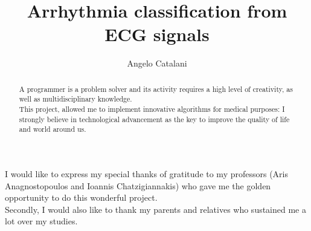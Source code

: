 \documentclass[LaM,binding=0.6cm]{sapthesis}
\title{Arrhythmia classification from ECG signals}
\author{Angelo Catalani}
\begin{document}
\frontmatter

\maketitle

\dedication{Dedicated to\\ my parents}

\begin{abstract}
A programmer is a problem solver and its activity requires a high level of creativity, as well as multidisciplinary knowledge.\\This project, allowed me to implement innovative algorithms for medical purposes: I strongly believe in technological advancement as the key to improve the quality of life and world around us.
\end{abstract}

\begin{acknowledgments}
I would like to express my special thanks of gratitude to my professors (Aris Anagnostopoulos and Ioannis Chatzigiannakis) who gave me the golden opportunity to do this wonderful project.\\Secondly, I would also like to thank my parents and relatives who sustained me a lot over my studies.
\end{acknowledgments}

\tableofcontents


\mainmatter
\end{document}
